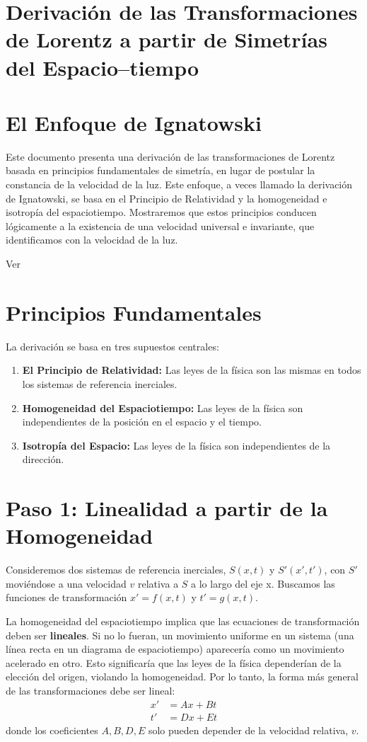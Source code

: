 \documentclass[11pt,a4paper]{book}
\begin{document}
\section{Derivación de las Transformaciones de Lorentz a partir de Simetrías del Espacio--tiempo}
\label{sec:tl}
\section{El Enfoque de Ignatowski}
Este documento presenta una derivación de las transformaciones de Lorentz basada en principios fundamentales de simetría, en lugar de postular la constancia de la velocidad de la luz. Este enfoque, a veces llamado la derivación de Ignatowski, se basa en el Principio de Relatividad y la homogeneidad e isotropía del espaciotiempo. Mostraremos que estos principios conducen lógicamente a la existencia de una velocidad universal e invariante, que identificamos con la velocidad de la luz.

Ver \cite{Datta:2022cpw} %


\section{Principios Fundamentales}
La derivación se basa en tres supuestos centrales:
\begin{enumerate}
    \item \textbf{El Principio de Relatividad:} Las leyes de la física son las mismas en todos los sistemas de referencia inerciales.
    \item \textbf{Homogeneidad del Espaciotiempo:} Las leyes de la física son independientes de la posición en el espacio y el tiempo.
    \item \textbf{Isotropía del Espacio:} Las leyes de la física son independientes de la dirección.
\end{enumerate}


\section{Paso 1: Linealidad a partir de la Homogeneidad}
Consideremos dos sistemas de referencia inerciales, $S(x,t)$ y $S'(x',t')$, con $S'$ moviéndose a una velocidad $v$ relativa a $S$ a lo largo del eje x. Buscamos las funciones de transformación $x' = f(x,t)$ y $t' = g(x,t)$.

La homogeneidad del espaciotiempo implica que las ecuaciones de transformación deben ser \textbf{lineales}. Si no lo fueran, un movimiento uniforme en un sistema (una línea recta en un diagrama de espaciotiempo) aparecería como un movimiento acelerado en otro. Esto significaría que las leyes de la física dependerían de la elección del origen, violando la homogeneidad. Por lo tanto, la forma más general de las transformaciones debe ser lineal:
\begin{align*}
x' &= Ax + Bt \\
t' &= Dx + Et
\end{align*}
donde los coeficientes $A, B, D, E$ solo pueden depender de la velocidad relativa, $v$.
\end{document}
